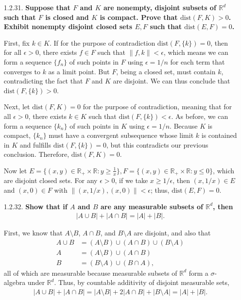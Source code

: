 \documentclass[a4paper,12pt]{article}
\newcommand{\norm}[1]{\left\lVert#1\right\rVert}
\begin{document}
\begin{enumerate}
    \item[1.2.31.]
        \boldmath\textbf{Suppose that $F$ and $K$ are nonempty, disjoint subsets of $\mathbb{R}^d$ such that $F$ is closed and $K$ is compact. Prove that $\text{dist}(F, K) > 0$. Exhibit nonempty disjoint closed sets $E, F$ such that $\text{dist}(E, F) = 0$.
        }\unboldmath \par
        First, fix $k \in K$. If for the purpose of contradiction $\text{dist}(F, \{k\}) = 0$, then for all $\epsilon > 0$, there exists $f \in F$ such that $\norm{f, k} < \epsilon$, which means we can form a sequence $\{f_n\}$ of such points in $F$ using $\epsilon = 1/n$ for each term that converges to $k$ as a limit point. But $F$, being a closed set, must contain $k$, contradicting the fact that $F$ and $K$ are disjoint. We can thus conclude that $\text{dist}(F, \{k\}) > 0$. \par
        Next, let $\text{dist}(F, K) = 0$ for the purpose of contradiction, meaning that for all $\epsilon > 0$, there exists $k \in K$ such that $\text{dist}(F, \{k\}) < \epsilon$. As before, we can form a sequence $\{k_n\}$ of such points in $K$ using $\epsilon = 1/n$. Because $K$ is compact, $\{k_n\}$ must have a convergent subsequence whose limit $k$ is contained in $K$ and fulfills $\text{dist}(F, \{k\}) = 0$, but this contradicts our previous conclusion. Therefore, $\text{dist}(F, K) = 0$. \par
        Now let $E = \{ (x, y) \in \mathbb{R}_+ \times \mathbb{R} : y \geq \frac{1}{x} \}, F = \{ (x, y) \in \mathbb{R}_+ \times \mathbb{R} : y \leq 0 \}$, which are disjoint closed sets. For any $\epsilon > 0$, if we take $x \geq 1/\epsilon$, then $(x, 1/x) \in E$ and $(x, 0) \in F$ with $\norm{(x, 1/x), (x, 0)} < \epsilon$; thus, $\text{dist}(E, F) = 0$.

    \item[1.2.32.]
        \boldmath\textbf{Show that if $A$ and $B$ are any measurable subsets of $\mathbb{R}^d$, then
        \begin{align*}
            |A \cup B| + |A \cap B| = |A| + |B|.
        \end{align*}
        }\unboldmath \par
        First, we know that $A \setminus B$, $A \cap B$, and $B \setminus A$ are disjoint, and also that
        \begin{align*}
            A \cup B &= (A \setminus B) \cup (A \cap B) \cup (B \setminus A) \\
            A &= (A \setminus B) \cup (A \cap B) \\
            B &= (B \setminus A) \cup (B \cap A),
        \end{align*}
        all of which are measurable because measurable subsets of $\mathbb{R}^d$ form a $\sigma$-algebra under $\mathbb{R}^d$. Thus, by countable additivity of disjoint measurable sets,
        \begin{align*}
            |A \cup B| + |A \cap B| = |A \setminus B| + 2|A \cap B| + |B \setminus A| = |A| + |B|.
        \end{align*}
\end{enumerate}
\end{document}

